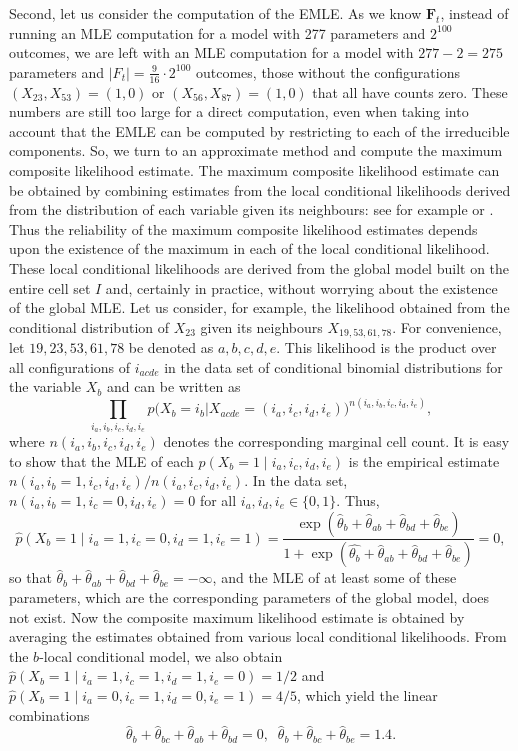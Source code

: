 \documentclass[aos,noinfoline]{imsart}
\newcommand{\Fbf}{\mathbf{F}}
\theoremstyle{remark}
\theoremstyle{definition}
\begin{document}
Second, let us consider the computation of the EMLE.
  As we know $\Fbf_{t}$, instead of running
an MLE computation for a model with 277 parameters and $2^{100}$ outcomes, we are left with an MLE computation for a model  with $277-2=275$ parameters and
 $|F_{t}| = \frac{9}{16}\cdot 2^{100}$ outcomes, those without the configurations $(X_{23}, X_{53})=(1,0)$ or $(X_{56}, X_{87})=(1,0)$ that all have counts zero.  These numbers are still too large for a direct
computation, even
when taking into account that the EMLE can be computed by restricting to each of the irreducible components. 
So, we turn to an approximate method and compute the  maximum composite likelihood estimate. The maximum composite likelihood estimate  can be obtained by combining estimates from the local conditional likelihoods derived from the distribution of each variable given its neighbours: see for example \cite{liu-ihler2012} or \cite{MassamWang18:Local_parameter_estimation}. Thus the reliability of the maximum composite likelihood estimates depends upon the existence of the maximum in each of the local conditional likelihood. These local conditional likelihoods are derived from the global model built on the entire cell set $I$ and, certainly in practice, without worrying about the existence of the global MLE. Let us consider, for example, the  likelihood obtained from the conditional distribution of $X_{23}$ given its neighbours $X_{19,53,61,78}$.  For convenience, let  $19,23, 53,61,78$ be denoted as $a, b, c, d, e$. This likelihood is the product over all configurations
of $i_{acde}$ in the data set of conditional binomial distributions for the variable $X_b$ and can be written  as
  \begin{equation}
  \label{lcp}
  \prod_{i_{a},i_{b},i_{c},i_{d},i_{e}} p\big(X_{b}=i_{b}\big| X_{acde} = (i_{a},i_{c},i_{d},i_{e})\big)^{n(i_{a},i_{b},i_{c},i_{d},i_{e})},
\end{equation}
where $n(i_{a},i_{b},i_{c},i_{d},i_{e})$ denotes the corresponding marginal cell count.
It is easy to show that the MLE of each $p(X_b=1\mid i_a,i_c, i_{d}, i_{e})$
is the empirical estimate $n(i_a, i_b=1, i_c, i_{d}, i_{e})/n(i_a, i_c,i_{d}, i_{e})$.
In the data set, $n(i_{a},i_b=1,i_c=0, i_{d}, i_{e})=0$ for all $i_{a},i_{d},i_{e}\in\{0,1\}$.
Thus,
$$\hat{p}(X_b=1\mid i_a=1, i_c=0, i_d=1, i_e=1)=\frac{\exp(\hat{\theta}_b+\hat{\theta}_{ab}+\hat{\theta}_{bd}+\hat{\theta}_{be})}{1+\exp(\hat{\theta_b}+\hat{\theta}_{ab}+\hat{\theta}_{bd}+\hat{\theta}_{be})}=0,$$
so that  $\hat{\theta}_b+\hat{\theta}_{ab}+\hat{\theta}_{bd}+\hat{\theta}_{be}=-\infty$, and the MLE of at least some of these parameters, which are the corresponding parameters of the global model,  does not exist.
Now the composite maximum likelihood estimate is obtained by averaging the estimates obtained from various local conditional likelihoods. From the $b$-local conditional model, we also obtain $\hat{p}(X_b=1\mid i_a=1,  i_c=1, i_d=1, i_e=0)=1/2$ and $\hat{p}(X_b=1\mid i_a=0, i_c=1, i_d=0, i_e=1)=4/5$, which yield the linear combinations
\begin{equation}
\label{combi}
\hat{\theta}_b+\hat{\theta}_{bc}+\hat{\theta}_{ab}+\hat{\theta}_{bd}=0,\;\;\hat{\theta}_b+\hat{\theta}_{bc}+\hat{\theta}_{be}=1.4.
\end{equation}
\end{document}
